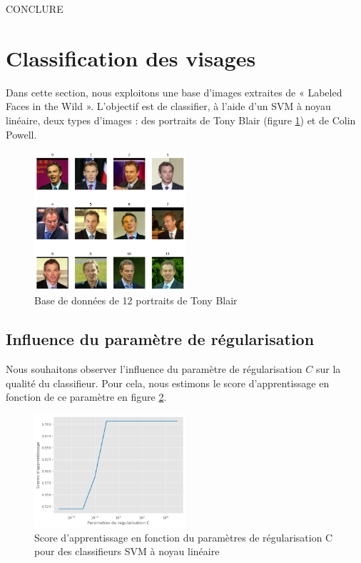 \documentclass[a4paper,12pt]{article}
\begin{document}
CONCLURE

\newpage

\section{Classification des visages}

Dans cette section, nous exploitons une base d'images extraites de « Labeled Faces in the Wild ».
L'objectif est de classifier, à l'aide d'un SVM à noyau linéaire, deux types d'images : des portraits de Tony Blair (figure \ref{fig : visages}) et de Colin Powell. 


\begin{figure}[H]
    \centering
    \includegraphics[width=0.5\textwidth]{Images/visages.png}
    \caption{Base de données de 12 portraits de Tony Blair}\label{fig : visages}
\end{figure}

\subsection{Influence du paramètre de régularisation}

Nous souhaitons observer l'influence du paramètre de régularisation $C$ sur la qualité du classifieur. 
Pour cela, nous estimons le score d'apprentissage en fonction de ce paramètre en figure \ref{fig : C}.

\begin{figure}[H]
    \centering
    \includegraphics[width=0.5\textwidth]{Images/erreur_prediction.png}
    \caption{Score d'apprentissage en fonction du paramètres de régularisation C pour des classifieurs SVM à noyau linéaire}\label{fig : C}
\end{figure}
\end{document}
